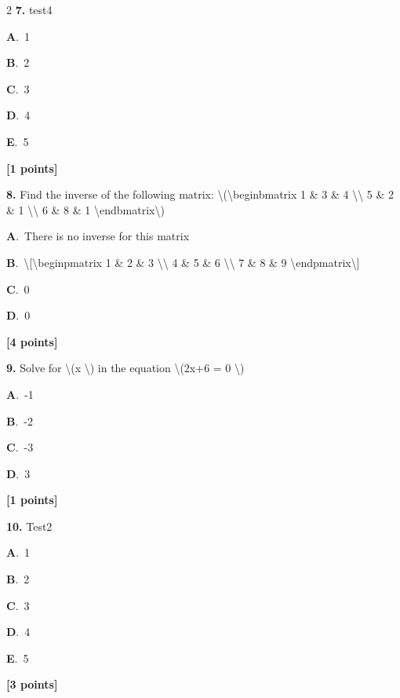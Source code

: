 \documentclass[12pt]{article}
\newcommand{\choice}[3]{%
  \noindent\textbf{#1}.~#2\hfill#3\par\vspace{0.25em}
}
\begin{document}
\begin{multicols}{2}
\noindent \textbf{\textenglish{7.}} {\textenglish{test4}}

\noindent\choice{A}{{\textenglish{1}}}{}
\noindent\choice{B}{{\textenglish{2}}}{}
\noindent\choice{C}{{\textenglish{3}}}{}
\noindent\choice{D}{{\textenglish{4}}}{}
\noindent\choice{E}{{\textenglish{5}}}{}
\hfill \textbf{[1 points]}\vspace{0.5em}

\noindent \textbf{\textenglish{8.}} {\textenglish{Find the inverse of the following matrix: \textbackslash{}(\textbackslash{}begin{bmatrix} 1 \& 3 \& 4 \textbackslash{}\textbackslash{} 5 \& 2 \& 1 \textbackslash{}\textbackslash{} 6 \& 8 \& 1 \textbackslash{}end{bmatrix}\textbackslash{})}}

\noindent\choice{A}{{\textenglish{There is no inverse for this matrix}}}{}
\noindent\choice{B}{{\textenglish{\textbackslash{}[\textbackslash{}begin{pmatrix} 1 \& 2 \& 3 \textbackslash{}\textbackslash{} 4 \& 5 \& 6 \textbackslash{}\textbackslash{} 7 \& 8 \& 9  \textbackslash{}end{pmatrix}\textbackslash{}]}}}{}
\noindent\choice{C}{{\textenglish{0}}}{}
\noindent\choice{D}{{\textenglish{0}}}{}
\hfill \textbf{[4 points]}\vspace{0.5em}

\noindent \textbf{\textenglish{9.}} {\textenglish{Solve for \textbackslash{}(x \textbackslash{}) in the equation \textbackslash{}(2x+6 = 0 \textbackslash{})}}

\noindent\choice{A}{{\textenglish{-1}}}{}
\noindent\choice{B}{{\textenglish{-2}}}{}
\noindent\choice{C}{{\textenglish{-3}}}{}
\noindent\choice{D}{{\textenglish{3}}}{}
\hfill \textbf{[1 points]}\vspace{0.5em}

\noindent \textbf{\textenglish{10.}} {\textenglish{Test2}}

\noindent\choice{A}{{\textenglish{1}}}{}
\noindent\choice{B}{{\textenglish{2}}}{}
\noindent\choice{C}{{\textenglish{3}}}{}
\noindent\choice{D}{{\textenglish{4}}}{}
\noindent\choice{E}{{\textenglish{5}}}{}
\hfill \textbf{[3 points]}\vspace{0.5em}


\end{multicols}
\end{document}

